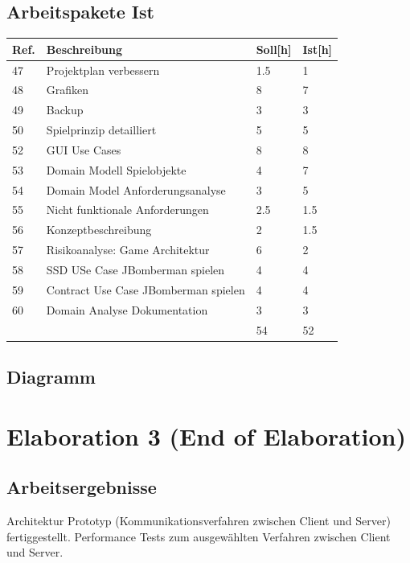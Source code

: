 \documentclass[11pt]{scrartcl}
\begin{document}
  \subsection{Arbeitspakete Ist}
  \begin{tabularx} {\linewidth}{lXll}
    \bf{Ref.}  & \bf{Beschreibung} & \bf{Soll[h]}  & \bf{Ist[h]}\\
    \hline
    47 & Projektplan verbessern & 1.5 & 1\\
    48 & Grafiken & 8 & 7\\
    49 &  Backup & 3 & 3\\
    50 & Spielprinzip detailliert & 5 & 5\\
    52 &  GUI Use Cases & 8 & 8\\
    53 & Domain Modell Spielobjekte & 4 & 7\\
    54 & Domain Model Anforderungsanalyse & 3 & 5\\
    55 & Nicht funktionale Anforderungen & 2.5 & 1.5\\
    56 & Konzeptbeschreibung & 2 & 1.5\\
    57 & Risikoanalyse: Game Architektur  & 6 & 2\\
    58 & SSD USe Case JBomberman spielen & 4 & 4\\
    59 & Contract Use Case JBomberman spielen & 4 & 4\\
    60 & 	Domain Analyse Dokumentation & 3 & 3 \\
    \hline
    & & 54 & 52
    \end{tabularx}

\subsection{Diagramm}

\section{Elaboration 3 (End of Elaboration)}
\subsection{Arbeitsergebnisse}
Architektur Prototyp (Kommunikationsverfahren zwischen Client und Server) 
fertiggestellt. 
Performance Tests zum ausgewählten Verfahren zwischen Client und Server.
\end{document}
